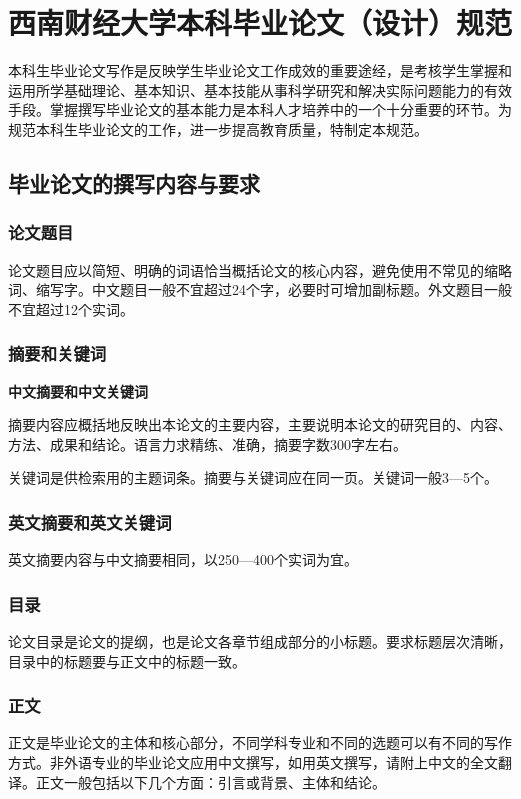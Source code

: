 \section{西南财经大学本科毕业论文（设计）规范}
本科生毕业论文写作是反映学生毕业论文工作成效的重要途经，是考核学生掌握和运用所学基础理论、基本知识、基本技能从事科学研究和解决实际问题能力的有效手段。掌握撰写毕业论文的基本能力是本科人才培养中的一个十分重要的环节。为规范本科生毕业论文的工作，进一步提高教育质量，特制定本规范。

\subsection{毕业论文的撰写内容与要求}
\subsubsection{论文题目}
论文题目应以简短、明确的词语恰当概括论文的核心内容，避免使用不常见的缩略词、缩写字。中文题目一般不宜超过24个字，必要时可增加副标题。外文题目一般不宜超过12个实词。
\subsubsection{摘要和关键词}
\textbf{中文摘要和中文关键词}

摘要内容应概括地反映出本论文的主要内容，主要说明本论文的研究目的、内容、方法、成果和结论。语言力求精练、准确，摘要字数300字左右。

关键词是供检索用的主题词条。摘要与关键词应在同一页。关键词一般3—5个。

\subsubsection{英文摘要和英文关键词}
英文摘要内容与中文摘要相同，以250—400个实词为宜。

\subsubsection{目录}
论文目录是论文的提纲，也是论文各章节组成部分的小标题。要求标题层次清晰，目录中的标题要与正文中的标题一致。

\subsubsection{正文}

正文是毕业论文的主体和核心部分，不同学科专业和不同的选题可以有不同的写作方式。非外语专业的毕业论文应用中文撰写，如用英文撰写，请附上中文的全文翻译。正文一般包括以下几个方面：引言或背景、主体和结论。

